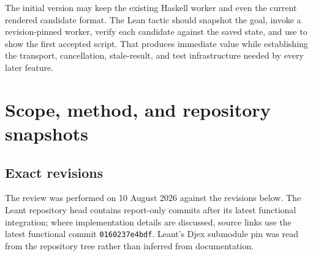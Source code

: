 \documentclass[11pt,letterpaper,openany]{report}
\newcommand{\code}[1]{\texttt{\detokenize{#1}}}
\newcommand{\commit}[1]{\texttt{\small #1}}
\begin{document}
The initial version may keep the existing Haskell worker and even the current rendered
candidate format. The Lean tactic should snapshot the goal, invoke a revision-pinned
worker, verify each candidate against the saved state, and use \code{TryThis} to show
the first accepted script. That produces immediate value while establishing the
transport, cancellation, stale-result, and test infrastructure needed by every later
feature.

\chapter{Scope, method, and repository snapshots}
\label{ch:scope}

\section{Exact revisions}

The review was performed on 10 August 2026 against the revisions below. The Leant
repository head contains report-only commits after its latest functional integration;
where implementation details are discussed, source links use the latest functional
commit \commit{0160237e4bdf}. Leant's Djex submodule pin was read from the repository
tree rather than inferred from documentation.
\end{document}
